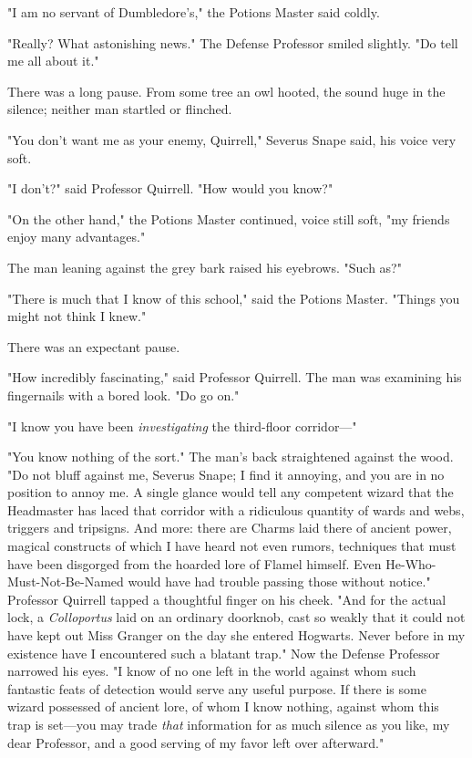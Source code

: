 "I am no servant of Dumbledore's," the Potions Master said coldly.

"Really? What astonishing news." The Defense Professor smiled slightly. "Do
tell me all about it."

There was a long pause. From some tree an owl hooted, the sound huge in the
silence; neither man startled or flinched.

"You don't want me as your enemy, Quirrell," Severus Snape said, his voice very
soft.

"I don't?" said Professor Quirrell. "How would you know?"

"On the other hand," the Potions Master continued, voice still soft, "my
friends enjoy many advantages."

The man leaning against the grey bark raised his eyebrows. "Such as?"

"There is much that I know of this school," said the Potions Master. "Things
you might not think I knew."

There was an expectant pause.

"How incredibly fascinating," said Professor Quirrell. The man was examining
his fingernails with a bored look. "Do go on."

"I know you have been{\el} \emph{investigating{\el}} the third-floor
corridor—"

"You know nothing of the sort." The man's back straightened against the wood.
"Do not bluff against me, Severus Snape; I find it annoying, and you are in no
position to annoy me. A single glance would tell any competent wizard that the
Headmaster has laced that corridor with a ridiculous quantity of wards and
webs, triggers and tripsigns. And more: there are Charms laid there of ancient
power, magical constructs of which I have heard not even rumors, techniques
that must have been disgorged from the hoarded lore of Flamel himself. Even
He-Who-Must-Not-Be-Named would have had trouble passing those without notice."
Professor Quirrell tapped a thoughtful finger on his cheek. "And for the actual
lock, a \emph{Colloportus} laid on an ordinary doorknob, cast so weakly that it
could not have kept out Miss Granger on the day she entered Hogwarts. Never
before in my existence have I encountered such a blatant trap." Now the Defense
Professor narrowed his eyes. "I know of no one left in the world against whom
such fantastic feats of detection would serve any useful purpose. If there is
some wizard possessed of ancient lore, of whom I know nothing, against whom
this trap is set—you may trade \emph{that} information for as much silence as
you like, my dear Professor, and a good serving of my favor left over
afterward."

